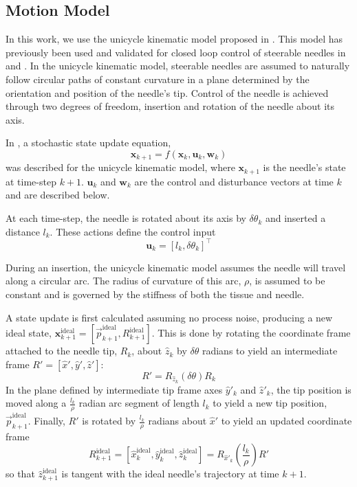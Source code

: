 \documentclass[journal,transmag]{IEEEtran}
\newcommand{\bvar}[2]{\mathbf{#1}_{#2}}
\begin{document}
\subsection{Motion Model} \label{subsec:unicycle}
In this work, we use the unicycle kinematic model proposed in \cite{Park2005}.  This model has previously been used and validated for closed loop control of steerable needles in \cite{Majewicz2013} and \cite{adebar2014recursive}.  In the unicycle kinematic model, steerable needles are assumed to naturally follow circular paths of constant curvature in a plane determined by the orientation and position of the needle's tip.  Control of the needle is achieved through two degrees of freedom, insertion and rotation of the needle about its axis.

In \cite{adebar2014recursive}, a stochastic state update equation,
\begin{equation*}
\bvar{x}{k+1} = f(\bvar{x}{k}, \bvar{u}{k}, \bvar{w}{k})
\end{equation*}  
was described for the unicycle kinematic model, where $\bvar{x}{k+1}$ is the needle's state at time-step $k+1$. $\bvar{u}{k}$ and $\bvar{w}{k}$ are the control and disturbance vectors at time $k$ and are described below.  

At each time-step, the needle is rotated about its axis by $\delta \theta_k$ and inserted a distance $l_k$.  These actions define the control input 
\begin{equation*}
\bvar{u}{k} = \left[l_k, \delta\theta_k\right]^\top
\end{equation*}  

During an insertion, the unicycle kinematic model assumes the needle will travel along a circular arc.  The radius of curvature of this arc, $\rho$, is assumed to be constant and is governed by the stiffness of both the tissue and needle.  

A state update is first calculated assuming no process noise, producing a new ideal state, $\bvar{x}{k+1}^{\text{ideal}} = \left[\vec{p}^{\text{ideal}}_{k+1}, R^{\text{ideal}}_{k+1}\right]$.  This is done by rotating the coordinate frame attached to the needle tip, $R_k$, about $\hat{z}_k$ by $\delta \theta$ radians to yield an intermediate frame $R' = [\hat{x}', \hat{y}', \hat{z}']$:
\begin{equation*}
R' = R_{\hat{z}_k}(\delta\theta)R_k
\end{equation*}
In the plane defined by intermediate tip frame axes $\hat{y}'_k$ and $\hat{z}'_k$, the tip position is moved along a $\frac{l_k}{\rho}$ radian arc segment of length $l_k$ to yield a new tip position, $\vec{p}^{\text{ideal}}_{k+1}$.  Finally, $R'$ is rotated by $\frac{l_k}{\rho}$ radians about $\hat{x}'$ to yield an updated coordinate frame
\begin{equation*}
R^{\text{ideal}}_{k+1} = [\hat{x}^{\text{ideal}}_k, \hat{y}^{\text{ideal}}_k, \hat{z}^{\text{ideal}}_k] = R_{\hat{x}'_k}\left(\frac{l_k}{\rho}\right)R'
\end{equation*}
so that $\hat{z}^{\text{ideal}}_{k+1}$ is tangent with the ideal needle's trajectory at time $k+1$.  
\end{document}
